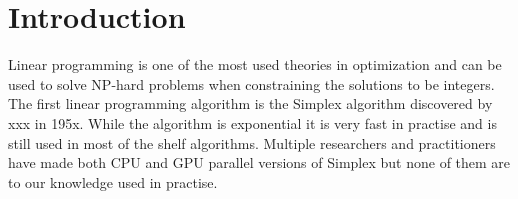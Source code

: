 \section{Introduction}
Linear programming is one of the most used theories in optimization and can be used to solve NP-hard problems when constraining the solutions to be integers. The first linear programming algorithm is the Simplex algorithm discovered by xxx in 195x. While the algorithm is exponential it is very fast in practise and is still used in most of the shelf algorithms. Multiple researchers and practitioners have made both CPU and GPU parallel versions of Simplex but none of them are to our knowledge  used in practise.